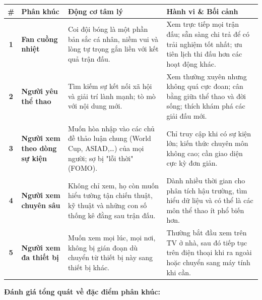 \bigskip
\begin{center}
\small
\begin{tabularx}{\textwidth}{|c|l|p{3.5cm}|X|}
\hline
\textbf{\#} & \textbf{Phân khúc} & \textbf{Động cơ tâm lý} & \textbf{Hành vi \& Bối cảnh} \\
\hline
\textbf{1} & \textbf{Fan cuồng nhiệt} & Coi đội bóng là một phần bản sắc cá nhân, niềm vui và lòng tự trọng gắn liền với kết quả trận đấu. & Xem trực tiếp mọi trận đấu; sẵn sàng chi trả để có trải nghiệm tốt nhất; ưu tiên lịch thi đấu hơn các hoạt động khác. \\
\hline
\textbf{2} & \textbf{Người yêu thể thao} & Tìm kiếm sự kết nối xã hội và giải trí lành mạnh; tò mò với nội dung mới. & Xem thường xuyên nhưng không quá cực đoan; cân bằng giữa thể thao và đời sống; thích khám phá các giải đấu mới. \\
\hline
\textbf{3} & \textbf{Người xem theo dòng sự kiện} & Muốn hòa nhập vào các chủ đề thảo luận chung (World Cup, ASIAD,\dots) của mọi người; sợ bị "lỗi thời" (FOMO). & Chỉ truy cập khi có sự kiện lớn; kiến thức chuyên môn không cao; cần giao diện cực kỳ đơn giản. \\
\hline
\textbf{4} & \textbf{Người xem chuyên sâu} & Không chỉ xem, họ còn muốn hiểu tường tận chiến thuật, kỹ thuật và những con số thống kê đằng sau trận đấu. & Dành nhiều thời gian cho phân tích hậu trường, tìm hiểu dữ liệu và có thể là các môn thể thao ít phổ biến hơn. \\
\hline
\textbf{5} & \textbf{Người xem đa thiết bị} & Muốn xem mọi lúc, mọi nơi, không bị gián đoạn dù chuyển từ thiết bị này sang thiết bị khác. & Thường bắt đầu xem trên TV ở nhà, sau đó tiếp tục trên điện thoại khi ra ngoài hoặc chuyển sang máy tính khi cần. \\
\hline
\end{tabularx}
\end{center}

\medskip\noindent\textbf{Đánh giá tổng quát về đặc điểm phân khúc:}

